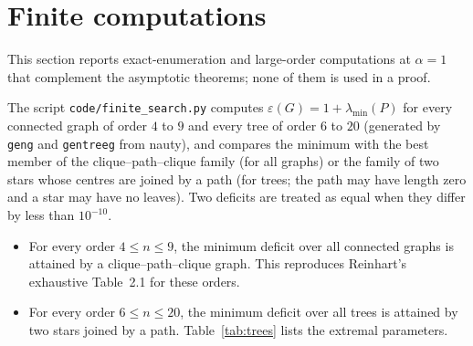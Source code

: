 \documentclass[11pt,a4paper]{article}
\theoremstyle{definition}
\newcommand{\eps}{\varepsilon}
\begin{document}
\section{Finite computations}\label{sec:finite}
This section reports exact-enumeration and large-order computations at $\alpha=1$ that complement the asymptotic theorems; none of them is used in a proof.

The script \texttt{code/finite\_search.py} computes $\eps(G)=1+\lambda_{\min}(P)$ for every connected graph of order $4$ to $9$ and every tree of order $6$ to $20$ (generated by \texttt{geng} and \texttt{gentreeg} from nauty), and compares the minimum with the best member of the clique--path--clique family (for all graphs) or the family of two stars whose centres are joined by a path (for trees; the path may have length zero and a star may have no leaves). Two deficits are treated as equal when they differ by less than $10^{-10}$.

\begin{itemize}
\item For every order $4\le n\le9$, the minimum deficit over all connected graphs is attained by a clique--path--clique graph. This reproduces Reinhart's exhaustive Table~2.1 \cite{reinhart} for these orders.
\item For every order $6\le n\le20$, the minimum deficit over all trees is attained by two stars joined by a path. Table~\ref{tab:trees} lists the extremal parameters.
\end{itemize}
\end{document}
